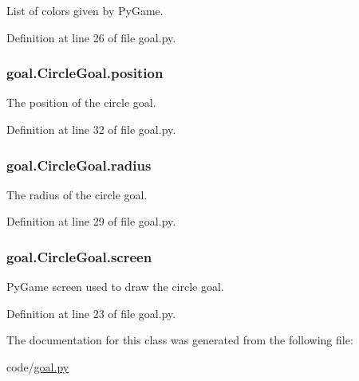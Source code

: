 List of colors given by Py\-Game. 



Definition at line 26 of file goal.\-py.

\hypertarget{classgoal_1_1CircleGoal_a5043cf3f8c23c20b038e44888e87622f}{
\subsubsection[{position}]{\setlength{\rightskip}{0pt plus 5cm}goal.\-Circle\-Goal.\-position}}\label{classgoal_1_1CircleGoal_a5043cf3f8c23c20b038e44888e87622f}


The position of the circle goal. 



Definition at line 32 of file goal.\-py.

\hypertarget{classgoal_1_1CircleGoal_ab0dbe63cd28b07d45ceedf1bce771b07}{
\subsubsection[{radius}]{\setlength{\rightskip}{0pt plus 5cm}goal.\-Circle\-Goal.\-radius}}\label{classgoal_1_1CircleGoal_ab0dbe63cd28b07d45ceedf1bce771b07}


The radius of the circle goal. 



Definition at line 29 of file goal.\-py.

\hypertarget{classgoal_1_1CircleGoal_a0868d7060d53cd1528aa699f65db3df3}{
\subsubsection[{screen}]{\setlength{\rightskip}{0pt plus 5cm}goal.\-Circle\-Goal.\-screen}}\label{classgoal_1_1CircleGoal_a0868d7060d53cd1528aa699f65db3df3}


Py\-Game screen used to draw the circle goal. 



Definition at line 23 of file goal.\-py.



The documentation for this class was generated from the following file\-:\begin{DoxyCompactItemize}
\item 
code/\hyperlink{goal_8py}{goal.\-py}\end{DoxyCompactItemize}
